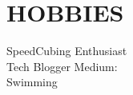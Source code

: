 \documentclass[]{deedy-resume-openfont}
\begin{document}
\newpage
\begin{minipage}[t]{0.30\textwidth} 


\section{HOBBIES}
\textbullet{} SpeedCubing Enthusiast  \\
\textbullet{} Tech Blogger Medium:  \href{https://medium.com/@anshul.ahu/}{} \\
\textbullet{} Swimming 
\sectionsep


\end{minipage} 
\hfill
\end{document}
